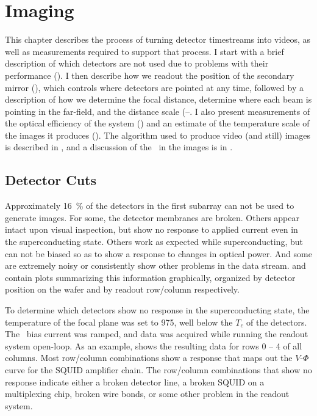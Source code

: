 \chapter{Imaging}\label{c:imaging}



This chapter describes the process of turning detector timestreams into videos, as well as measurements required to support that process.
I start with a brief description of which detectors are not used due to problems with their performance ().
I then describe how we readout the position of the secondary mirror (), which controls where detectors are pointed at any time, followed by a description of how we determine the focal distance, determine where each beam is pointing in the far-field, and the distance scale (--.
I also present measurements of the optical efficiency of the system () and an estimate of the temperature scale of the images it produces ().
The algorithm used to produce video (and still) images is described in , and a discussion of the \NETD\ in the images is in .

\section{Detector Cuts} \label{sec:ch8-det-cuts}

Approximately \SI{16}{\percent} of the detectors in the first subarray can not be used to generate images.
For some, the detector membranes are broken.
Others appear intact upon visual inspection, but show no response to applied current even in the superconducting state.
Others work as expected while superconducting, but can not be biased so as to show a response to changes in optical power. 
And some are extremely noisy or consistently show other problems in the data stream.
 and  contain plots summarizing this information graphically, organized by detector position on the wafer and by readout row/column respectively.

To determine which detectors show no response in the superconducting state, the temperature of the focal plane was set to \SI{975}{\mK}, well below the $T_c$ of the detectors.
The \TES\ bias current was ramped, and data was acquired while running the readout system open-loop.
As an example,  shows the resulting data for rows 0 -- 4 of all columns.
Most row/column combinations show a response that maps out the $V$-$\Phi$ curve for the SQUID amplifier chain.
The row/column combinations that show no response indicate either a broken detector line, a broken SQUID on a multiplexing chip, broken wire bonds, or some other problem in the readout system.

